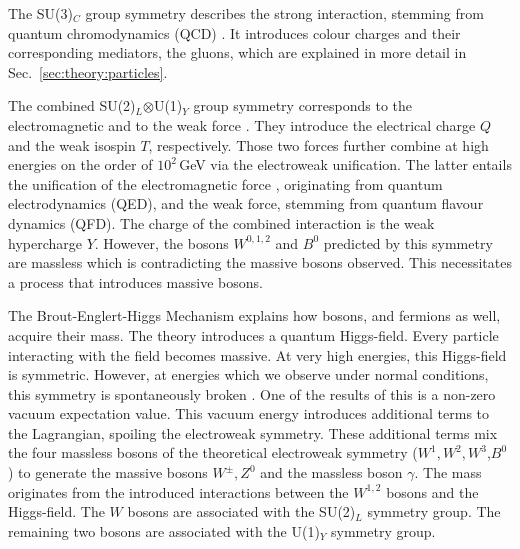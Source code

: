 \documentclass[bachelor,ngerman,english]{GAUBM}
\begin{document}

The SU(3)$_C$ group symmetry describes the strong interaction, stemming from quantum chromodynamics (QCD) \cite{theory:qcd_01,theory:qcd_02,theory:qcd_03,theory:qcd_04,theory:qcd_05}. It introduces colour charges and their corresponding mediators, the gluons, which are explained in more detail in Sec.~\ref{sec:theory:particles}.

The combined SU(2)$_L$$\otimes$U(1)$_Y$ group symmetry corresponds to the electromagnetic and to the weak force \cite{theory:qed_01,theory:qed_02,theory:qed_03,theory:qed_04,theory:qed_05}. They introduce the electrical charge $Q$ and the weak isospin $T$, respectively. Those two forces further combine at high energies on the order of $10^2$\,GeV via the electroweak unification. The latter entails the unification of the electromagnetic force \cite{theory:qed_01,theory:qed_02,theory:qed_03,theory:qed_04,theory:qed_05,theory:electroweak_01,theory:electroweak_02,theory:electroweak_03}, originating from quantum electrodynamics (QED), and the weak force, stemming from quantum flavour dynamics (QFD). The charge of the combined interaction is the weak hypercharge $Y$. However, the bosons $W^{0,1,2}$ and $B^0$ predicted by this symmetry are massless which is contradicting the massive bosons observed. This necessitates a process that introduces massive bosons. 

The Brout-Englert-Higgs Mechanism \cite{theory:higgs_mechanism_01,theory:higgs_mechanism_02,theory:higgs_mechanism_03} explains how bosons, and fermions as well, acquire their mass. The theory introduces a quantum Higgs-field. Every particle interacting with the field becomes massive. At very high energies, this Higgs-field is symmetric. However, at energies which we observe under normal conditions, this symmetry is spontaneously broken \cite{theory:spontaneous_symmetry_breaking}. One of the results of this is a non-zero vacuum expectation value. This vacuum energy introduces additional terms to the Lagrangian, spoiling the electroweak symmetry. These additional terms mix the four massless bosons of the theoretical electroweak symmetry ($W^1,W^2,W^3$,$B^0$) to generate the massive bosons $W^\pm, Z^0$ and the massless boson $\gamma$. The mass originates from the introduced interactions between the $W^{1,2}$ bosons and the Higgs-field. The $W$ bosons are associated with the SU(2)$_L$ symmetry group. The remaining two bosons are associated with the U(1)$_Y$ symmetry group.
\end{document}
